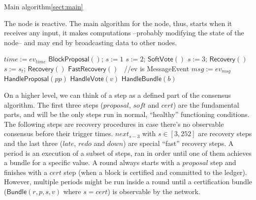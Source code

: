\documentclass[10pt,a4paper]{article}
\begin{document}
\begin{section}{Main algorithm}\ref{sect:main}
%

The node is reactive. The main algorithm for the node, thus, starts when it receives 
any input, it makes computations --probably modifying the state of the node-- and 
may end by broadcasting data to other nodes.

\begin{algorithm}[H]
    \caption{\underline{Main node algorithm}}
    \label{algo:main}
    \begin{algorithmic}[1]
    
        \State $time := ev_{time}$
            \State $\mathsf{BlockProposal}()$; $s:=1$
            \State $s:=2$; $\mathsf{SoftVote}()$
            \State $s:=3$; $\mathsf{Recovery}()$
        \ElsIf{$time\in[\max\{4\lambda, \Lambda \} + 2^{s_t-3}\lambda, \max\{4\lambda, \Lambda \} + 2^{s_t-2}\lambda)$ for some $s\le s_t \le 252$}
            \State $s:=s_t $; $\mathsf{Recovery}()$
            \State $\mathsf{FastRecovery}()$
        \EndIf
    \Else \ //ev is MessageEvent
        \State $msg := ev_{msg}$
            \State $\mathsf{HandleProposal}(pp)$
            \State $\mathsf{HandleVote}(v)$
            \State $\mathsf{HandleBundle}(b)$
        \EndIf
    \EndIf

    \EndFunction
    \end{algorithmic}
\end{algorithm}

On a higher level, we can think of a step as a defined part of the consensus algorithm. The first three steps
($proposal$, $soft$ and $cert$)
are the fundamental parts, and will be the only steps run in normal, ``healthy'' functioning conditions.
The following steps are recovery procedures in case there's no observable consensus before their trigger times.
$next_{s-3}$ with $s \in [3, 252]$ are recovery steps and the last three ($late$, $redo$ and $down$)
are special ``fast'' recovery steps.
A period is an execution of a subset of steps, ran in order until one of them achieves 
a bundle for a specific value. A round always starts with a $proposal$ step and finishes with a $cert$
step (when a block is certified and committed to the ledger). However, multiple periods might
be run inside a round until a certification bundle ($\mathsf{Bundle}(r,p,s,v) $ where $s = cert$) is observable by the network.


\end{section}
\end{document}
